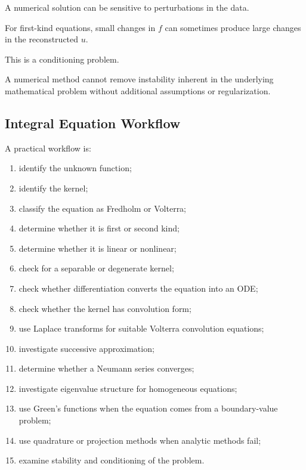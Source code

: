 A numerical solution can be sensitive to perturbations in the data.

For first-kind equations, small changes in \(f\) can sometimes produce
large changes in the reconstructed \(u\).

This is a conditioning problem.

A numerical method cannot remove instability inherent in the underlying
mathematical problem without additional assumptions or regularization.

\subsection{Integral Equation Workflow}
\label{subsec:integral-equation-workflow}

A practical workflow is:

\begin{enumerate}
    \item identify the unknown function;
    \item identify the kernel;
    \item classify the equation as Fredholm or Volterra;
    \item determine whether it is first or second kind;
    \item determine whether it is linear or nonlinear;
    \item check for a separable or degenerate kernel;
    \item check whether differentiation converts the equation into an ODE;
    \item check whether the kernel has convolution form;
    \item use Laplace transforms for suitable Volterra convolution
          equations;
    \item investigate successive approximation;
    \item determine whether a Neumann series converges;
    \item investigate eigenvalue structure for homogeneous equations;
    \item use Green's functions when the equation comes from a
          boundary-value problem;
    \item use quadrature or projection methods when analytic methods fail;
    \item examine stability and conditioning of the problem.
\end{enumerate}

